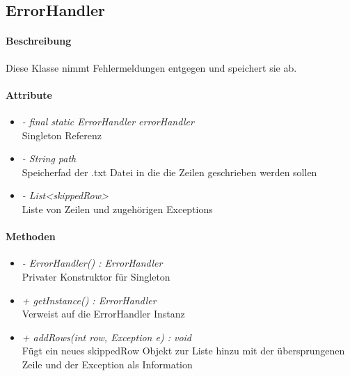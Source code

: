 \subsection{ErrorHandler}

\paragraph{Beschreibung}
Diese Klasse nimmt Fehlermeldungen entgegen und speichert sie ab.

\paragraph{Attribute}
\begin{itemize}
\item \textit{ - final static ErrorHandler errorHandler}
\\ Singleton Referenz
\item \textit{ - String path}
\\ Speicherfad der .txt Datei in die die Zeilen geschrieben werden sollen
\item \textit{ - List<skippedRow>}
\\ Liste von Zeilen und zugehörigen Exceptions
\end{itemize}

\paragraph{Methoden}

\begin{itemize}
\item \textit{ - ErrorHandler() : ErrorHandler}  \\Privater Konstruktor für Singleton
\item \textit{ + getInstance() : ErrorHandler} \\Verweist auf die ErrorHandler Instanz
\item \textit{ + addRows(int row, Exception e) : void}
\\Fügt ein neues skippedRow Objekt zur Liste hinzu mit der übersprungenen Zeile und der Exception als Information 

\end{itemize}